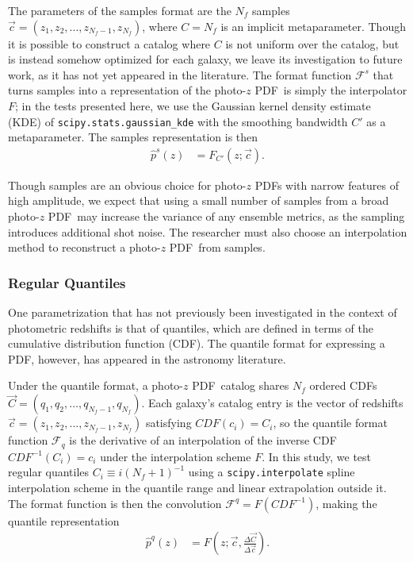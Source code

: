 \documentclass[\docopts]{\docclass}
\newcommand{\pz}{photo-$z$ PDF}
\begin{document}
The parameters of the samples format are the $N_{f}$ samples $\vec{c}=(z_{1}, 
z_{2}, \dots, z_{N_{f}-1}, z_{N_{f}})$, where $C=N_{f}$ is an implicit 
metaparameter.
Though it is possible to construct a catalog where $C$ is not uniform over the 
catalog, but is instead somehow optimized for each galaxy, we leave its 
investigation to future work, as it has not yet appeared in the literature.
The format function $\mathcal{F}^{s}$ that turns samples into a representation 
of the \pz\ is simply the interpolator $F$; in the tests presented here, we use 
the Gaussian kernel density estimate (KDE) of 
\texttt{scipy.stats.gaussian\_kde} with the smoothing bandwidth $C'$ as a 
metaparameter.  The samples representation is then
\begin{align}
  \label{eq:sampled}
  \hat{p}^{s}(z) &= F_{C'}(z; \vec{c}).
\end{align}

Though samples are an obvious choice for \pz s with narrow features of high 
amplitude, we expect that using a small number of samples from a broad \pz\ may 
increase the variance of any ensemble metrics, as the sampling introduces 
additional shot noise.
The researcher must also choose an interpolation method to reconstruct a \pz\ 
from samples.

\subsubsection{Regular Quantiles}
\label{sec:quantiles}

One parametrization that has not previously been investigated in the context of 
photometric redshifts is that of quantiles, which are defined in terms of the 
cumulative distribution function (CDF).
The quantile format for expressing a PDF, however, has appeared in the 
astronomy literature.  \citep{sun_star_2015, pizzocaro_results_2016, 
laycock_x-ray_2017}

Under the quantile format, a \pz\ catalog shares $N_{f}$ ordered CDFs 
$\vec{C}=(q_{1}, q_{2}, \dots, q_{N_{f}-1}, q_{N_{f}})$.
Each galaxy's catalog entry is the vector of redshifts $\vec{c}=(z_{1}, z_{2}, 
\dots, z_{N_{f}-1}, z_{N_{f}})$ satisfying $CDF(c_{i})=C_{i}$, so the quantile 
format function $\mathcal{F}_{q}$ is the derivative of an interpolation of the 
inverse CDF $CDF^{-1}(C_{i})=c_{i}$ under the interpolation scheme $F$.
In this study, we test regular quantiles $C_{i}\equiv i(N_{f}+1)^{-1}$ using a 
\texttt{scipy.interpolate} spline interpolation scheme in the quantile range 
and linear extrapolation outside it.
The format function is then the convolution $\mathcal{F}^{q}=F(CDF^{-1})$, 
making the quantile representation
\begin{align}
  \label{eq:quantiles}
  \hat{p}^{q}(z) &= F\left(z; \vec{c}, 
\frac{\Delta\vec{C}}{\Delta\vec{c}}\right).
\end{align}
\end{document}
